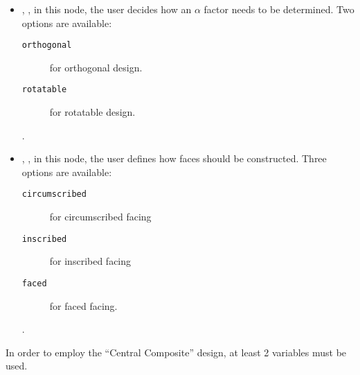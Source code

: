\begin{itemize}
\begin{itemize}
\begin{itemize}
\begin{itemize}
        .
      \item {}, , in this node,
        the user decides how an $\alpha$ factor needs to be determined.
        Two options are available:
        \begin{description}
          \item[\texttt{orthogonal}] for orthogonal design.
          \item[\texttt{rotatable}] for rotatable design.
        \end{description}
        .
      \item {}, , in this node,
        the user defines how faces should be constructed.
        Three options are available:
        \begin{description}
          \item[\texttt{circumscribed}] for circumscribed facing
          \item[\texttt{inscribed}] for inscribed facing
          \item[\texttt{faced}] for faced facing.
        \end{description}
        .
     \end{itemize}
  \end{itemize}
  \nb In order to employ the ``Central Composite'' design, at least 2
  variables must be used.
\end{itemize}
\end{itemize}



